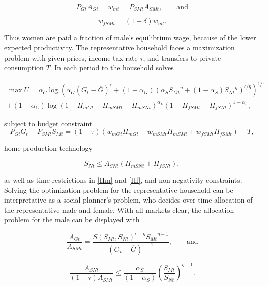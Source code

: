 \documentclass[a4paper,12pt]{article}
\begin{document}
\begin{equation}\label{PA}
P_{Gt} A_{Gt} = w_{mt} = P_{SMt} A_{SMt}, \qquad \text{and}
\end{equation}

\begin{equation}\label{wGGf}
	w_{fSMt} = (1-\delta) w_{mt}.
\end{equation}

Thus women are paid a fraction of male's equilibrium wage, because of the lower expected productivity. The representative household faces a maximization problem with given prices, income tax rate $\tau$, and transfers to private consumption $T$. In each period to the household solves

\begin{multline}
\max U= \alpha_C \log (\alpha_G (G_t - \overline{G})^\epsilon + (1-\alpha_G)(\alpha_S {S_{Mt}}^\eta + (1-\alpha_S) {S_{Nt}}^\eta )^{\epsilon/\eta}) ^{1/\epsilon} \\ + 
(1-\alpha_C) \log (1-  H_{mGt} - H_{mSMt} - H_{mSNt})^{\alpha_L} {(1 - H_{fSMt} - H_{fSNt})}^{1-\alpha_L},
\label{maxU}
\end{multline}

subject to budget constraint 
\begin{equation}
\label{BG} 
P_{Gt} G_t + P_{SMt} S_{Mt} = (1-\tau) (w_{mGt} H_{mGt} + w_{mSMt} H_{mSMt}+ w_{fSMt} H_{fSMt}) +T,
\end{equation}

home production technology

\begin{equation}\label{HP}
S_{Nt} \leq  A_{SNt} (H_{mSNt}+ H_{fSNt}),
\end{equation}

as well as time restrictions in \eqref{Hm} and \eqref{Hf}, and non-negativity constraints. Solving the optimization problem for the representative household can be interpretative as a social planner's problem, who decides over time allocation of the representative male and female. With all markets clear, the allocation problem for the male can be displayed with


\begin{equation}\label{GS}
\frac{A_{Gt}}{A_{SMt}} = \frac{S(S_{Mt}, S_{Nt})^{\epsilon-\eta} {S_{Mt}}^{\eta-1}}{(G_t - \overline{G})^{\epsilon-1}}, \qquad \text{and}
\end{equation}

\begin{equation}\label{mSMN}
\frac{A_{SNt}}{(1-\tau) A_{SMt}} \leq \frac{\alpha_S}{(1-\alpha_S)} {\left(\frac{S_{Mt}}{S_{Nt}}\right)}^{\eta -1}.
\end{equation}
\end{document}
